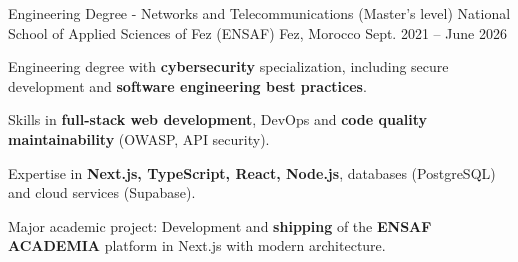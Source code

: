 
\begin{cventries}

    \cventry
    {Engineering Degree - Networks and Telecommunications (Master's level)} %
    {National School of Applied Sciences of Fez (ENSAF)} %
    {Fez, Morocco} %
    {Sept. 2021 – June 2026} %
    {
        \begin{cvitems} %
            \item {Engineering degree with \textbf{cybersecurity} specialization, including secure development and \textbf{software engineering best practices}.}
            \item {Skills in \textbf{full-stack web development}, DevOps and \textbf{code quality maintainability} (OWASP, API security).}
            \item {Expertise in \textbf{Next.js, TypeScript, React, Node.js}, databases (PostgreSQL) and cloud services (Supabase).}
            \item {Major academic project: Development and \textbf{shipping} of the \textbf{ENSAF ACADEMIA} platform in Next.js with modern architecture.}
        \end{cvitems}
    }
\end{cventries}